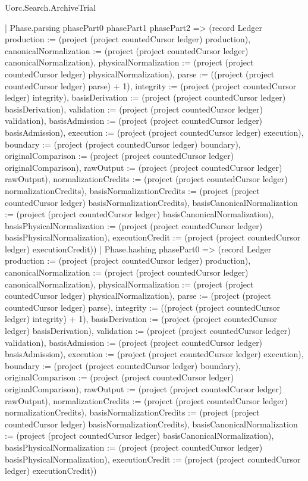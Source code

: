 \begin{lexlean}{Uorc.Search.ArchiveTrial}
\begin{semanticmodule}
{{    | Phase.parsing phasePart0 phasePart1 phasePart2 => (record Ledger {production := (project (project countedCursor ledger) production), canonicalNormalization := (project (project countedCursor ledger) canonicalNormalization), physicalNormalization := (project (project countedCursor ledger) physicalNormalization), parse := ((project (project countedCursor ledger) parse) + 1), integrity := (project (project countedCursor ledger) integrity), basisDerivation := (project (project countedCursor ledger) basisDerivation), validation := (project (project countedCursor ledger) validation), basisAdmission := (project (project countedCursor ledger) basisAdmission), execution := (project (project countedCursor ledger) execution), boundary := (project (project countedCursor ledger) boundary), originalComparison := (project (project countedCursor ledger) originalComparison), rawOutput := (project (project countedCursor ledger) rawOutput), normalizationCredits := (project (project countedCursor ledger) normalizationCredits), basisNormalizationCredits := (project (project countedCursor ledger) basisNormalizationCredits), basisCanonicalNormalization := (project (project countedCursor ledger) basisCanonicalNormalization), basisPhysicalNormalization := (project (project countedCursor ledger) basisPhysicalNormalization), executionCredit := (project (project countedCursor ledger) executionCredit)})
    | Phase.hashing phasePart0 => (record Ledger {production := (project (project countedCursor ledger) production), canonicalNormalization := (project (project countedCursor ledger) canonicalNormalization), physicalNormalization := (project (project countedCursor ledger) physicalNormalization), parse := (project (project countedCursor ledger) parse), integrity := ((project (project countedCursor ledger) integrity) + 1), basisDerivation := (project (project countedCursor ledger) basisDerivation), validation := (project (project countedCursor ledger) validation), basisAdmission := (project (project countedCursor ledger) basisAdmission), execution := (project (project countedCursor ledger) execution), boundary := (project (project countedCursor ledger) boundary), originalComparison := (project (project countedCursor ledger) originalComparison), rawOutput := (project (project countedCursor ledger) rawOutput), normalizationCredits := (project (project countedCursor ledger) normalizationCredits), basisNormalizationCredits := (project (project countedCursor ledger) basisNormalizationCredits), basisCanonicalNormalization := (project (project countedCursor ledger) basisCanonicalNormalization), basisPhysicalNormalization := (project (project countedCursor ledger) basisPhysicalNormalization), executionCredit := (project (project countedCursor ledger) executionCredit)})
}}
\end{semanticmodule}
\end{lexlean}
